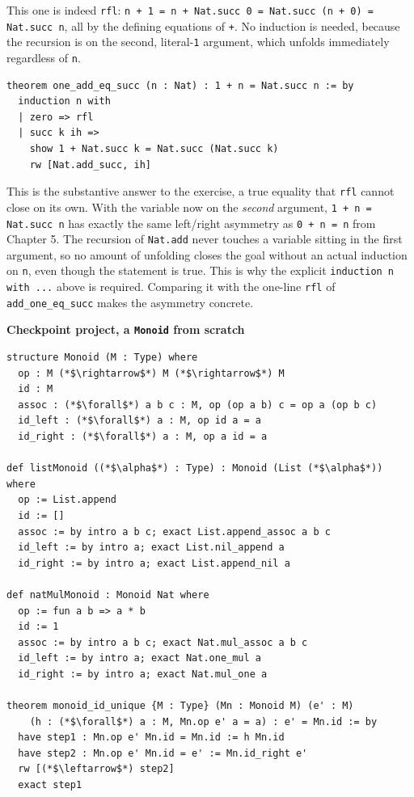 This one is indeed \texttt{rfl}: \texttt{n + 1 = n + Nat.succ 0 = Nat.succ (n + 0) = Nat.succ n}, all by the defining equations of \texttt{+}. No induction is needed, because the recursion is on the second, literal-\texttt{1} argument, which unfolds immediately regardless of \texttt{n}.

\begin{lstlisting}
theorem one_add_eq_succ (n : Nat) : 1 + n = Nat.succ n := by
  induction n with
  | zero => rfl
  | succ k ih =>
    show 1 + Nat.succ k = Nat.succ (Nat.succ k)
    rw [Nat.add_succ, ih]
\end{lstlisting}

This is the substantive answer to the exercise, a true equality that \texttt{rfl} cannot close on its own. With the variable now on the \emph{second} argument, \texttt{1 + n = Nat.succ n} has exactly the same left/right asymmetry as \texttt{0 + n = n} from Chapter 5. The recursion of \texttt{Nat.add} never touches a variable sitting in the first argument, so no amount of unfolding closes the goal without an actual induction on \texttt{n}, even though the statement is true. This is why the explicit \texttt{induction n with ...} above is required. Comparing it with the one-line \texttt{rfl} of \texttt{add\_\allowbreak{}one\_\allowbreak{}eq\_\allowbreak{}succ} makes the asymmetry concrete.

\textbf{Checkpoint project, a \texttt{Monoid} from scratch}

\begin{lstlisting}
structure Monoid (M : Type) where
  op : M (*$\rightarrow$*) M (*$\rightarrow$*) M
  id : M
  assoc : (*$\forall$*) a b c : M, op (op a b) c = op a (op b c)
  id_left : (*$\forall$*) a : M, op id a = a
  id_right : (*$\forall$*) a : M, op a id = a

def listMonoid ((*$\alpha$*) : Type) : Monoid (List (*$\alpha$*)) where
  op := List.append
  id := []
  assoc := by intro a b c; exact List.append_assoc a b c
  id_left := by intro a; exact List.nil_append a
  id_right := by intro a; exact List.append_nil a

def natMulMonoid : Monoid Nat where
  op := fun a b => a * b
  id := 1
  assoc := by intro a b c; exact Nat.mul_assoc a b c
  id_left := by intro a; exact Nat.one_mul a
  id_right := by intro a; exact Nat.mul_one a

theorem monoid_id_unique {M : Type} (Mn : Monoid M) (e' : M)
    (h : (*$\forall$*) a : M, Mn.op e' a = a) : e' = Mn.id := by
  have step1 : Mn.op e' Mn.id = Mn.id := h Mn.id
  have step2 : Mn.op e' Mn.id = e' := Mn.id_right e'
  rw [(*$\leftarrow$*) step2]
  exact step1
\end{lstlisting}

